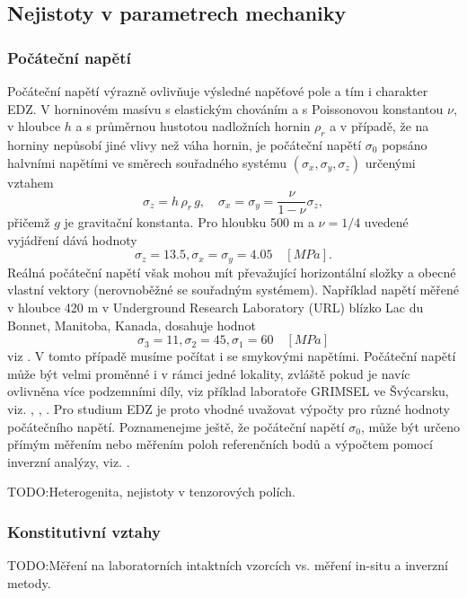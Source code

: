 \documentclass{article}
\def\todo#1{{TODO:\color{violet}#1}}
\begin{document}
\subsection{Nejistoty v parametrech mechaniky}

\subsubsection{Počáteční napětí}
\label{sec:sigma0}
Počáteční napětí výrazně ovlivňuje výsledné napěťové pole a tím i charakter EDZ.
V horninovém masívu s elastickým chováním a s Poissonovou konstantou $\nu$, v hloubce $h$ a s průměrnou hustotou nadložních hornin $\rho_{r}$ a v případě,
že na horniny nepůsobí jiné vlivy než váha hornin, je počáteční napětí $\sigma_0$
popsáno halvními napětími ve směrech souřadného systému $(\sigma_x, \sigma_y, \sigma_z)$ určenými vztahem
\begin{equation}
	\sigma_z = h\,\rho_{r}\, g, \quad \sigma_x = \sigma_y = \frac{\nu}{1-\nu} \sigma_z,
\end{equation}
přičemž $g$ je gravitační konstanta. Pro hloubku 500 m a $\nu = 1/4$ uvedené vyjádření dává hodnoty
$$
	\sigma_z = 13.5, \sigma_x = \sigma_y = 4.05\quad [MPa].
$$
Reálná počáteční napětí však mohou mít převažující horizontální složky a obecné vlastní vektory (nerovnoběžné se souřadným systémem). Například napětí měřené v hloubce 420 m v Underground Research Laboratory (URL) blízko Lac du Bonnet, Manitoba, Kanada, dosahuje hodnot
$$
	\sigma_3 = 11, \sigma_2 = 45, \sigma_1 = 60\quad [MPa]
$$
viz \cite{Rutqvist2009}. V tomto případě musíme počítat i se smykovými napětími. Počáteční napětí může být velmi proměnné i v rámci jedné lokality, zvláště pokud je navíc ovlivněna více podzemními díly, viz příklad laboratoře GRIMSEL ve Švýcarsku, viz. \cite{Krietsch2019},
\cite{Stas2016}, \cite{Rutqvist2004}. Pro studium EDZ je proto vhodné uvažovat výpočty pro různé hodnoty počátečního napětí.
Poznamenejme  ještě, že počáteční napětí $\sigma_0$, může být určeno přímým měřením nebo měřením poloh referenčních bodů 
a výpočtem pomocí inverzní analýzy, viz. \cite{Malik2021}.

\todo{Heterogenita, nejistoty v tenzorových polích.}


\subsubsection{Konstitutivní vztahy}



\todo{Měření na laboratorních intaktních vzorcích vs. měření in-situ a inverzní metody.}
\end{document}
